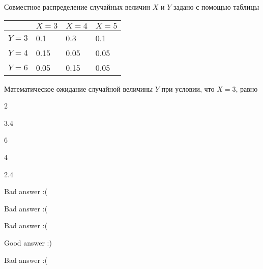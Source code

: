 
\begin{question}
Совместное распределение случайных величин \(X\) и \(Y\) задано с помощью таблицы

\begin{tabular}{llll}
\toprule
& $X=3$     &  $X=4$    & $X=5$    \\
\midrule
$Y= 3$  & 0.1   &  0.3  & 0.1   \\
$Y= 4$  & 0.15  &  0.05 & 0.05  \\
$Y =6$  & 0.05  &  0.15 & 0.05  \\
\bottomrule
\end{tabular}

Математическое ожидание случайной величины \(Y\) при условии, что \(X=3\), равно
\begin{answerlist}
  \item 2
  \item 3.4
  \item 6
  \item 4
  \item 2.4
\end{answerlist}
\end{question}

\begin{solution}
\begin{answerlist}
  \item Bad answer :(
  \item Bad answer :(
  \item Bad answer :(
  \item Good answer :)
  \item Bad answer :(
\end{answerlist}
\end{solution}

